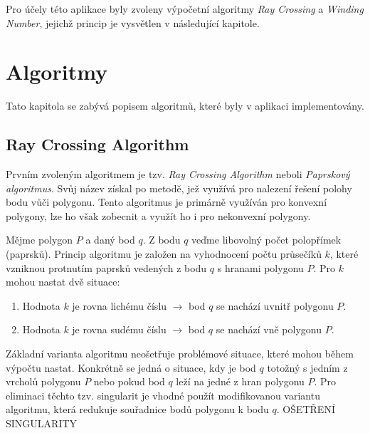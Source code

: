 \documentclass[a4paper, 12pt]{article}
\begin{document}
Pro účely této aplikace byly zvoleny výpočetní algoritmy \textit{Ray Crossing} a \textit{Winding Number}, jejichž princip je vysvětlen v následující kapitole.

\section{Algoritmy}
Tato kapitola se zabývá popisem algoritmů, které byly v aplikaci implementovány. 

\subsection{Ray Crossing Algorithm}
Prvním zvoleným algoritmem je tzv. \textit{Ray Crossing Algorithm} neboli \textit{Paprskový algoritmus}. Svůj název získal po metodě, jež využívá pro nalezení řešení polohy bodu vůči polygonu. Tento algoritmus je primárně využíván pro konvexní polygony, lze ho však zobecnit a využít ho i pro nekonvexní polygony. 

Mějme polygon $P$ a daný bod $q$. Z bodu $q$ veďme libovolný počet polopřímek (paprsků). Princip algoritmu je založen na vyhodnocení počtu průsečíků $k$, které vzniknou protnutím paprsků vedených z bodu $q$ s hranami polygonu $P$. Pro $k$ mohou nastat dvě situace:
\begin{enumerate}
\item Hodnota $k$ je rovna lichému číslu $\rightarrow$ bod $q$ se nachází uvnitř polygonu $P$.
\item Hodnota $k$ je rovna sudému číslu $\rightarrow$ bod $q$ se nachází vně polygonu $P$.
\end{enumerate}

Základní varianta algoritmu neošetřuje problémové situace, které mohou během výpočtu nastat. Konkrétně se jedná o situace, kdy je bod $q$ totožný s jedním z vrcholů polygonu $P$ nebo pokud bod $q$ leží na jedné z hran polygonu $P$. Pro eliminaci těchto tzv. singularit je vhodné použít modifikovanou variantu algoritmu, která redukuje souřadnice bodů polygonu k bodu $q$. 
OŠETŘENÍ SINGULARITY
\end{document}
